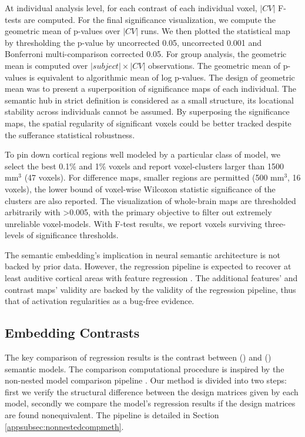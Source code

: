 At individual analysis level, for each contrast of each individual voxel, \( \lvert CV \rvert \) F-tests are computed. For the final significance visualization, we compute the geometric mean of p-values over \(\lvert CV \rvert \) runs. We then plotted the statistical map by thresholding the p-value by uncorrected 0.05, uncorrected 0.001 and Bonferroni multi-comparison corrected 0.05. For group analysis, the geometric mean is computed over \(\lvert subject \rvert \times \lvert CV \rvert \) observations. The geometric mean of p-values is equivalent to algorithmic mean of log p-values. The design of geometric mean was to present a superposition of significance maps of each individual. The semantic hub in strict definition is considered as a small structure, its locational stability across individuals cannot be assumed. By superposing the significance maps, the spatial regularity of significant voxels could be better tracked despite the sufferance statistical robustness. 

To pin down cortical regions well modeled by a particular class of model, we select the best 0.1\% and 1\% voxels and report voxel-clusters larger than 1500 \(\text{mm}^3\) (47 voxels). For  difference maps, smaller regions are permitted (500 \(\text{mm}^3\), 16 voxels), the lower bound of voxel-wise Wilcoxon statistic significance of the clusters are also reported. The visualization of whole-brain maps are thresholded arbitrarily with >0.005, with the primary objective to filter out extremely unreliable voxel-models. With F-test results, we report voxels surviving three-levels of significance thresholds.

The semantic embedding's implication in neural semantic architecture is not backed by prior data. However, the regression pipeline is expected to recover at least auditive cortical areas with  feature regression . The additional features' and contrast maps' validity are backed by the validity of the regression pipeline, thus that of  activation regularities as a bug-free evidence.

\subsection{Embedding Contrasts}
The key comparison of regression results is the contrast between \similarity () and \association () semantic models. The comparison computational procedure is inspired by the non-nested model comparison pipeline \parencite{merkleTestingNonnestedStructural2016}. Our method is divided into two steps: first we verify the structural difference between the design matrices given by each model, secondly we compare the model's regression results if the design matrices are found nonequivalent. The pipeline is detailed in Section \ref{appsubsec:nonnestedcompmeth}.


